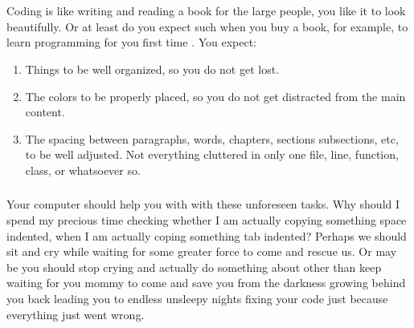 

%


\chapter{}


\section{}

    Coding is like writing and reading a book for the large people, you like it
    to look beautifully. Or at least do you expect such when you buy a book, for
    example, to learn programming for you first time \cite{howNovicesRead}.
    You expect:

\begin{enumerate}
    \item
        Things to be well organized,
        so you do not get lost.
    \item
        The colors to be properly placed,
        so you do not get distracted from the main content.
    \item
        The spacing between paragraphs, words, chapters, sections
        subsections, etc, to be well adjusted.
        Not everything cluttered in only one file,
        line, function, class, or whatsoever so.
\end{enumerate}


\subsection{}

    Your computer should help you with with these unforeseen tasks.
    Why should I spend my precious time checking whether I am actually copying
    something space indented,
    when I am actually coping something tab indented?
    Perhaps we should sit and cry while waiting for some greater force to come
    and rescue us. Or may be you should stop crying and actually do something
    about other than keep waiting for you mommy to come and save you from the
    darkness growing behind you back leading you to endless unsleepy nights
    fixing your code just because everything just went wrong.


